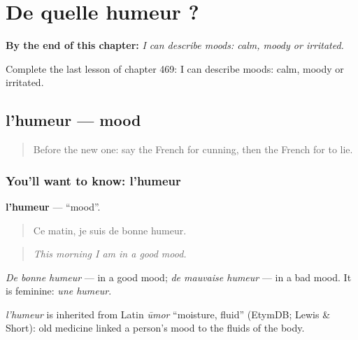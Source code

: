 
\chapter{De quelle humeur ?}
\label{ch:fr-de-quelle-humeur}

\begin{chapteropening}
\textbf{By the end of this chapter:} \emph{I can describe moods: calm, moody or irritated.}

Complete the last lesson of chapter 469: I can describe moods: calm, moody or irritated.
\end{chapteropening}

\section[l'humeur]{l'humeur — mood}

\label{lesson:FR-C469-humeur}



\begin{quote}
Before the new one: say the French for cunning, then the French for to lie.
\end{quote}

\subsection*{You'll want to know: l'humeur}
\textbf{l'humeur} — \textquotedblleft{}mood\textquotedblright{}.

\begin{quote}
Ce matin, je suis de bonne humeur.
\end{quote}

\begin{quote}
\emph{This morning I am in a good mood.}
\end{quote}

\emph{De bonne humeur} — in a good mood; \emph{de mauvaise humeur} — in a bad mood. It is feminine: \emph{une humeur}.

\begin{cousinweb}
\emph{l'humeur} is inherited from Latin \emph{ūmor} \textquotedblleft{}moisture, fluid\textquotedblright{} (EtymDB; Lewis \& Short): old medicine linked a person's mood to the fluids of the body.
\end{cousinweb}

